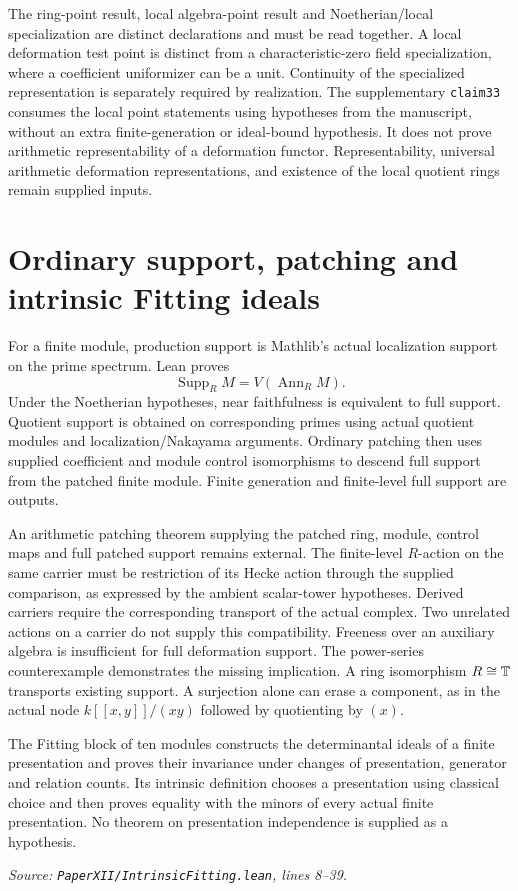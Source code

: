 \documentclass[11pt]{article}
\newcommand{\code}[1]{\nolinkurl{#1}}
\newcommand{\excerpt}[3]{\par\smallskip\textit{Source: \code{PaperXII/#1.lean}, lines #2--#3.}\par\VerbatimInput[fontsize=\scriptsize,breaklines=true,breakanywhere=true,numbers=left,numbersep=4pt,firstline=#2,lastline=#3,firstnumber=#2,frame=lines]{excerpts/#1.display.txt}\par}
\newcommand{\Supp}{\operatorname{Supp}}\newcommand{\Spec}{\operatorname{Spec}}
\newcommand{\Ann}{\operatorname{Ann}}\newcommand{\Fitt}{\operatorname{Fitt}}
\begin{document}
The ring-point result, local algebra-point result and Noetherian/local specialization are distinct declarations and must be read together. A local deformation test point is distinct from a characteristic-zero field specialization, where a coefficient uniformizer can be a unit. Continuity of the specialized representation is separately required by realization. The supplementary \code{claim33} consumes the local point statements using hypotheses from the manuscript, without an extra finite-generation or ideal-bound hypothesis. It does not prove arithmetic representability of a deformation functor. Representability, universal arithmetic deformation representations, and existence of the local quotient rings remain supplied inputs.

\section{Ordinary support, patching and intrinsic Fitting ideals}
For a finite module, production support is Mathlib's actual localization support on the prime spectrum. Lean proves
\[
\Supp_R M=V(\Ann_R M).
\]
Under the Noetherian hypotheses, near faithfulness is equivalent to full support. Quotient support is obtained on corresponding primes using actual quotient modules and localization/Nakayama arguments. Ordinary patching then uses supplied coefficient and module control isomorphisms to descend full support from the patched finite module. Finite generation and finite-level full support are outputs.

An arithmetic patching theorem supplying the patched ring, module, control maps and full patched support remains external. The finite-level \(R\)-action on the same carrier must be restriction of its Hecke action through the supplied comparison, as expressed by the ambient scalar-tower hypotheses. Derived carriers require the corresponding transport of the actual complex. Two unrelated actions on a carrier do not supply this compatibility. Freeness over an auxiliary algebra is insufficient for full deformation support. The power-series counterexample demonstrates the missing implication. A ring isomorphism \(R\cong\mathbb T\) transports existing support. A surjection alone can erase a component, as in the actual node \(k[[x,y]]/(xy)\) followed by quotienting by \((x)\).

The Fitting block of ten modules constructs the determinantal ideals of a finite presentation and proves their invariance under changes of presentation, generator and relation counts. Its intrinsic definition chooses a presentation using classical choice and then proves equality with the minors of every actual finite presentation. No theorem on presentation independence is supplied as a hypothesis.
\excerpt{IntrinsicFitting}{8}{39}
\end{document}
